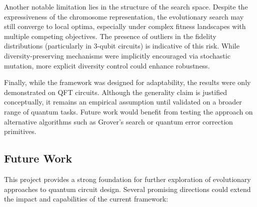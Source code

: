 \documentclass[11pt,a4paper]{article}
\begin{document}
Another notable limitation lies in the structure of the search space. Despite the expressiveness of the chromosome representation, the evolutionary search may still converge to local optima, especially under complex fitness landscapes with multiple competing objectives. The presence of outliers in the fidelity distributions (particularly in 3-qubit circuits) is indicative of this risk. While diversity-preserving mechanisms were implicitly encouraged via stochastic mutation, more explicit diversity control could enhance robustness.\newline

Finally, while the framework was designed for adaptability, the results were only demonstrated on QFT circuits. Although the generality claim is justified conceptually, it remains an empirical assumption until validated on a broader range of quantum tasks. Future work would benefit from testing the approach on alternative algorithms such as Grover's search or quantum error correction primitives.

\subsection{Future Work}
This project provides a strong foundation for further exploration of evolutionary approaches to quantum circuit design. Several promising directions could extend the impact and capabilities of the current framework:
\end{document}
